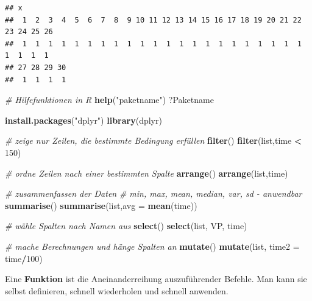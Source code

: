 \documentclass[]{book}
\newenvironment{Shaded}{\begin{snugshade}}{\end{snugshade}}
\newcommand{\KeywordTok}[1]{\textcolor[rgb]{0.13,0.29,0.53}{\textbf{#1}}}
\newcommand{\DataTypeTok}[1]{\textcolor[rgb]{0.13,0.29,0.53}{#1}}
\newcommand{\DecValTok}[1]{\textcolor[rgb]{0.00,0.00,0.81}{#1}}
\newcommand{\StringTok}[1]{\textcolor[rgb]{0.31,0.60,0.02}{#1}}
\newcommand{\CommentTok}[1]{\textcolor[rgb]{0.56,0.35,0.01}{\textit{#1}}}
\newcommand{\OperatorTok}[1]{\textcolor[rgb]{0.81,0.36,0.00}{\textbf{#1}}}
\newcommand{\NormalTok}[1]{#1}
\begin{document}
\begin{verbatim}
## x
##  1  2  3  4  5  6  7  8  9 10 11 12 13 14 15 16 17 18 19 20 21 22 23 24 25 26 
##  1  1  1  1  1  1  1  1  1  1  1  1  1  1  1  1  1  1  1  1  1  1  1  1  1  1 
## 27 28 29 30 
##  1  1  1  1
\end{verbatim}

\begin{Shaded}
\begin{Highlighting}[]
\CommentTok{# Hilfefunktionen in R}
\KeywordTok{help}\NormalTok{(}\StringTok{"paketname"}\NormalTok{)}
\NormalTok{?Paketname}
\end{Highlighting}
\end{Shaded}

\begin{Shaded}
\begin{Highlighting}[]
\KeywordTok{install.packages}\NormalTok{(}\StringTok{"dplyr"}\NormalTok{)}
\KeywordTok{library}\NormalTok{(dplyr)}

\CommentTok{# zeige nur Zeilen, die bestimmte Bedingung erfüllen}
\KeywordTok{filter}\NormalTok{()}
\KeywordTok{filter}\NormalTok{(list,time }\OperatorTok{<}\StringTok{ }\DecValTok{150}\NormalTok{)}

\CommentTok{# ordne Zeilen nach einer bestimmten Spalte}
\KeywordTok{arrange}\NormalTok{()}
\KeywordTok{arrange}\NormalTok{(list,time)}
\end{Highlighting}
\end{Shaded}

\begin{Shaded}
\begin{Highlighting}[]
\CommentTok{# zusammenfassen der Daten}
\CommentTok{# min, max, mean, median, var, sd - anwendbar}
\KeywordTok{summarise}\NormalTok{()}
\KeywordTok{summarise}\NormalTok{(list,}\DataTypeTok{avg =} \KeywordTok{mean}\NormalTok{(time))}

\CommentTok{# wähle Spalten nach Namen aus}
\KeywordTok{select}\NormalTok{()}
\KeywordTok{select}\NormalTok{(list, VP, time)}

\CommentTok{# mache Berechnungen und hänge Spalten an}
\KeywordTok{mutate}\NormalTok{()}
\KeywordTok{mutate}\NormalTok{(list, }\DataTypeTok{time2 =}\NormalTok{ time}\OperatorTok{/}\DecValTok{100}\NormalTok{)}
\end{Highlighting}
\end{Shaded}

Eine \textbf{Funktion} ist die Aneinanderreihung auszuführender Befehle.
Man kann sie selbst definieren, schnell wiederholen und schnell
anwenden.
\end{document}
